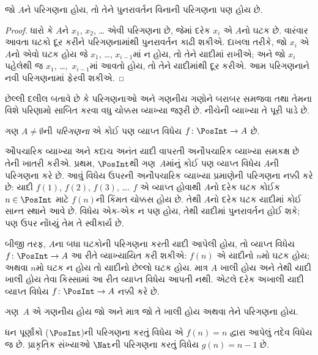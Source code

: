 \begin{prop}
જો $A$ને પરિગણના હોય, તો તેને પુનરાવર્તન વિનાની
પરિગણના પણ હોય છે.
\end{prop}

\begin{proof}
ધારો કે $A$ને $x_1$, $x_2$, \dots{} એવી પરિગણના
છે, જેમાં દરેક $x_i$ એ $A$નો ઘટક છે.
વારંવાર આવતા ઘટકો દૂર કરીને પરિગણનામાંથી
પુનરાવર્તન કાઢી શકીએ. દાખલા તરીકે, જો $x_i$ એ
$A$નો એવો ઘટક હોય જે $x_1$, \dots,
$x_{i-1}$માં ન હોય, તો તેને યાદીમાં રાખીએ;
અને જો $x_i$ પહેલેથી જ $x_1$, \dots,~$x_{i-1}$માં
આવતો હોય, તો તેને યાદીમાંથી દૂર કરીએ. આમ પરિગણનાને
નવી પરિગણનામાં ફેરવી શકીએ.
\end{proof}

છેલ્લી દલીલ બતાવે છે કે પરિગણનાઓ અને ગણનીય
ગણોને બરાબર સમજવા તથા તેમના વિશે પરિણામો સાબિત કરવા
વધુ ચોક્કસ વ્યાખ્યા જરૂરી છે. નીચેની વ્યાખ્યા તે પૂરી પાડે છે.

\begin{defn}
ગણ $A \neq \emptyset$ની \emph{પરિગણના} એ કોઈ પણ
વ્યાપ્ત વિધેય $f \colon \PosInt \to A$ છે.
\end{defn}

\begin{explain}
ઔપચારિક વ્યાખ્યા અને કદાચ અનંત યાદી વાપરતી અનૌપચારિક
વ્યાખ્યા સમકક્ષ છે તેની ખાતરી કરીએ. પ્રથમ,
$\PosInt$થી ગણ~$A$માંનું કોઈ પણ વ્યાપ્ત
વિધેય $A$ની પરિગણના કરે છે. આવું વિધેય ઉપરની
અનૌપચારિક વ્યાખ્યા પ્રમાણેની પરિગણના નક્કી કરે છે:
યાદી $f(1)$, $f(2)$, $f(3)$, \dots.
$f$ એ વ્યાપ્ત હોવાથી $A$નો દરેક ઘટક
કોઈક~$n \in \PosInt$ માટે $f(n)$ની કિંમત
ચોક્કસ હોય છે. તેથી $A$નો દરેક ઘટક યાદીમાં
કોઈ સાન્ત સ્થાને આવે છે. વિધેય એક-એક
ન પણ હોય, તેથી યાદીમાં પુનરાવર્તન હોઈ શકે;
પણ ઉપર નોંધ્યું તેમ તે સ્વીકાર્ય છે.

બીજી તરફ, $A$ના બધા ઘટકોની પરિગણના
કરતી યાદી આપેલી હોય, તો વ્યાપ્ત વિધેય
$f\colon \PosInt \to A$ આ રીતે વ્યાખ્યાયિત કરી શકીએ:
$f(n)$ એ યાદીનો $n$મો ઘટક હોય; અથવા
$n$મો ઘટક ન હોય તો યાદીનો છેલ્લો
ઘટક હોય. માત્ર $A$ ખાલી હોય અને તેથી
યાદી ખાલી હોય તેવા કિસ્સામાં આ રીત વ્યાપ્ત
વિધેય આપતી નથી. એટલે દરેક અખાલી યાદી
વ્યાપ્ત વિધેય $f\colon \PosInt \to A$
નક્કી કરે છે.
\end{explain}

\begin{defn}
ગણ~$A$ એ ગણનીય હોય જો અને માત્ર જો
તે ખાલી હોય અથવા તેને પરિગણના હોય.
\end{defn}

\begin{ex}
ધન પૂર્ણાંકો ($\PosInt$)ની પરિગણના કરતું વિધેય
એ $f(n) = n$ દ્વારા આપેલું તદેવ વિધેય જ છે.
પ્રાકૃતિક સંખ્યાઓ $\Nat$ની પરિગણના કરતું વિધેય
$g(n) = n - 1$ છે.
\end{ex}

